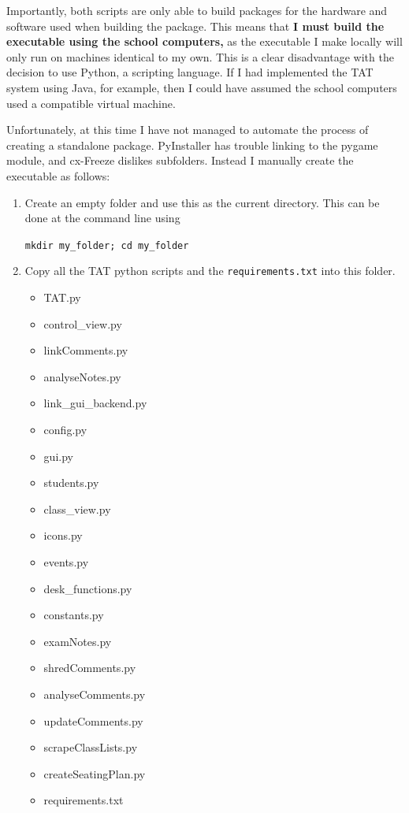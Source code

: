 \documentclass[10pt]{article}
\begin{document}
Importantly, both scripts are only able to build packages for the hardware and software used when building the package. This means that \textbf{I must build the executable using the school computers,} as the executable I make locally will only run on machines identical to my own. This is a clear disadvantage with the decision to use Python, a scripting language. If I had implemented the TAT system using Java, for example, then I could have assumed the school computers used a compatible virtual machine.

Unfortunately, at this time I have not managed to automate the process of creating a standalone package. PyInstaller has trouble linking to the pygame module, and cx-Freeze dislikes subfolders. Instead I manually create the executable as follows:

\begin{enumerate}
\item Create an empty folder and use this as the current directory. This can be done at the command line using

\texttt{mkdir my\_folder; cd my\_folder}

\item Copy all the TAT python scripts and the \texttt{requirements.txt} into this folder.

\vspace{1mm}

\begin{minipage}[t]{0.5\textwidth}
\begin{itemize} \scriptsize
\item TAT.py
\item control\_view.py
\item linkComments.py
\item analyseNotes.py
\item link\_gui\_backend.py
\item config.py
\item gui.py
\item students.py
\item class\_view.py
\item icons.py
\end{itemize}
\end{minipage}
\begin{minipage}[t]{0.5\textwidth}
\begin{itemize} \scriptsize
\item events.py
\item desk\_functions.py
\item constants.py
\item examNotes.py
\item shredComments.py
\item analyseComments.py
\item updateComments.py
\item scrapeClassLists.py
\item createSeatingPlan.py
\item requirements.txt
\end{itemize}
\end{minipage}


\end{enumerate}
\end{document}
